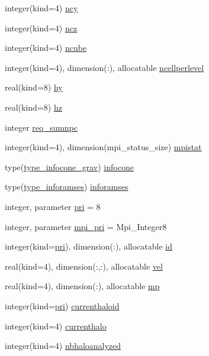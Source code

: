 \begin{DoxyCompactItemize}
integer(kind=4) \hyperlink{namespacemodvariable_ac9a317ff189f6a3f0bac9df49e622027}{ncy}
\item 
integer(kind=4) \hyperlink{namespacemodvariable_ad8d90278c9709b9db15059e8c320feb4}{ncz}
\item 
integer(kind=4) \hyperlink{namespacemodvariable_a718efb76ffcda6b833e85642669fd01e}{ncube}
\item 
integer(kind=4), dimension(\+:), allocatable \hyperlink{namespacemodvariable_ab27c6baa1a2f6fe45974edb46a27bd93}{ncellperlevel}
\item 
real(kind=8) \hyperlink{namespacemodvariable_a56edfdc4b391ae52b9bcce691c5119d5}{hy}
\item 
real(kind=8) \hyperlink{namespacemodvariable_a40a10b2561275758f13b237235540ea9}{hz}
\item 
integer \hyperlink{namespacemodvariable_adfc8585ffcde6504507af946c0afbea8}{req\+\_\+sumnpc}
\item 
integer(kind=4), dimension(mpi\+\_\+status\+\_\+size) \hyperlink{namespacemodvariable_a9d7821389828ef466b9e1fcffd62dd76}{mpistat}
\item 
type(\hyperlink{structmodconstant_1_1type__infocone__grav}{type\+\_\+infocone\+\_\+grav}) \hyperlink{namespacemodvariable_ab4ad6d71e8fdf948a8a42eb594ed9930}{infocone}
\item 
type(\hyperlink{structmodconstant_1_1type__inforamses}{type\+\_\+inforamses}) \hyperlink{namespacemodvariable_a2742babfa57f89ec1dc1afd6852dc04e}{inforamses}
\item 
integer, parameter \hyperlink{namespacemodvariable_aa1399b6a91a8f18eb517445b0af8533e}{pri} = 8
\item 
integer, parameter \hyperlink{namespacemodvariable_aad67fc4a7991eb6a3b666b4e42222117}{mpi\+\_\+pri} = Mpi\+\_\+\+Integer8
\item 
integer(kind=\hyperlink{namespacemodvariable_aa1399b6a91a8f18eb517445b0af8533e}{pri}), dimension(\+:), allocatable \hyperlink{namespacemodvariable_a2ab9f2b8f1081802eb503297c0a7372e}{id}
\item 
real(kind=4), dimension(\+:,\+:), allocatable \hyperlink{namespacemodvariable_a831a3150acc512605f816895b63eab56}{vel}
\item 
real(kind=4), dimension(\+:), allocatable \hyperlink{namespacemodvariable_abf22a007c4b2e71142484c3fe7a4977f}{mp}
\item 
integer(kind=\hyperlink{namespacemodvariable_aa1399b6a91a8f18eb517445b0af8533e}{pri}) \hyperlink{namespacemodvariable_a2bd6e10da8b4481e4b7731bc57037659}{currenthaloid}
\item 
integer(kind=4) \hyperlink{namespacemodvariable_af627e6ef340449e8897ec09697c8490c}{currenthalo}
\item 
integer(kind=4) \hyperlink{namespacemodvariable_ad881d35cf1a421a6a1c86b87c50c8810}{nbhaloanalyzed}
\end{DoxyCompactItemize}


